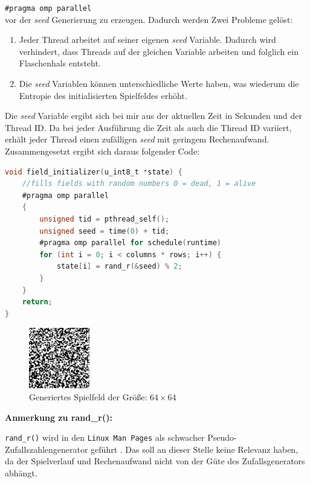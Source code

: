 \documentclass[german,plainarticle,hyperref,utf8]{zihpub}
\begin{document}
	\texttt{\#pragma omp parallel}\\
	
	vor der \textit{seed} Generierung zu erzeugen. Dadurch werden Zwei Probleme gelöst:
	\begin{enumerate}
		\item Jeder Thread arbeitet auf seiner eigenen \textit{seed} Variable. Dadurch wird verhindert, dass Threads auf der gleichen Variable arbeiten und folglich ein Flaschenhals entsteht.
		\item Die \textit{seed} Variablen können unterschiedliche Werte haben, was wiederum die Entropie des initialisierten Spielfeldes erhöht.
	\end{enumerate}
	
	Die \textit{seed} Variable ergibt sich bei mir aus der aktuellen Zeit in Sekunden und der Thread ID. Da bei jeder Ausführung die Zeit als auch die Thread ID variiert, erhält jeder Thread einen zufälligen \textit{seed} mit geringem Rechenaufwand.\\
	
	Zusammengesetzt ergibt sich daraus folgender Code:\\
	
	\begin{lstlisting}[language=C, caption=Daten Initialisierung]
void field_initializer(u_int8_t *state) {
	//fills fields with random numbers 0 = dead, 1 = alive
	#pragma omp parallel
	{
		unsigned tid = pthread_self();
		unsigned seed = time(0) + tid;
		#pragma omp parallel for schedule(runtime)
		for (int i = 0; i < columns * rows; i++) {
			state[i] = rand_r(&seed) % 2;
		}
	}
	return;
}\end{lstlisting}
	\begin{figure}[h]
		\begin{center}
			\includegraphics[scale=5.0]{initialized_board.pdf}
		\end{center}
		\caption{Generiertes Spielfeld der Größe: $64\times 64$}
	\end{figure}
	\newpage
	\textbf{Anmerkung zu rand\_r():}
	
	\texttt{rand\_r()} wird in den \texttt{Linux Man Pages} als schwacher Pseudo-Zufallszahlengenerator geführt \cite{lmp}. Das soll an dieser Stelle keine Relevanz haben, da der Spielverlauf und Rechenaufwand nicht von der Güte des Zufallsgenerators abhängt.
	
\end{document}
